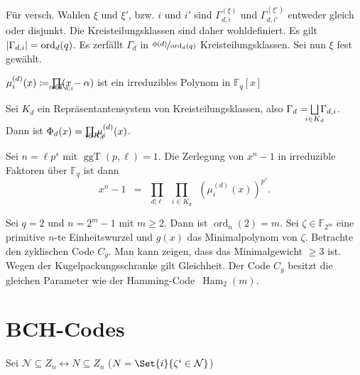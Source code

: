 \documentclass{cheat-sheet}
\newcommand{\F}{\mathbb{F}} %
\newcommand{\divides}{|} %
\DeclareMathOperator{\Ham}{Ham} %
\DeclareMathOperator{\ggT}{ggT} %
\DeclareMathOperator{\ord}{ord} %
\begin{document}
\begin{bem}
  Für versch. Wahlen $\xi$ und $\xi'$, bzw. $i$ und $i'$ sind $\Gamma^{(\xi)}_{d,i}$ und $\Gamma^{(\xi')}_{d,i'}$ entweder gleich oder disjunkt.
  Die Kreisteilungsklassen sind daher wohldefiniert.
  Es gilt $\abs{\Gamma_{d,i}} = \ord_d(q)$.
  Es zerfällt $\Gamma_d$ in $\nicefrac{\phi(d)}{\ord_d(q)}$ Kreisteilungsklassen.
  Sei nun $\xi$ fest gewählt.
\end{bem}

\begin{lem}
  $\mu^{(d)}_i(x) \coloneqq \prod_{\mathclap{\alpha \in \Gamma_{d,i}}} (x - \alpha)$ ist ein irreduzibles Polynom in $\F_q [x]$
\end{lem}

\begin{kor}
  Sei $K_d$ ein Repräsentantensystem von Kreisteilungsklassen, also
  $\Gamma_d = \bigsqcup_{\mathclap{i \in K_d}} \Gamma_{d,i}$.
  Dann ist $\Phi_d(x) = \prod_{\mathclap{i \in K_d}} \mu^{(d)}_i(x)$.
\end{kor}

\begin{fazit}
  Sei $n = \ell p^s$ mit $\ggT(p, \ell) = 1$.
  Die Zerlegung von $x^n - 1$ in irreduzible Faktoren über $\F_q$ ist dann
  \[
    x^n - 1 \enspace = \enspace \prod_{d \divides \ell} \enspace \prod_{i \in K_d} \enspace \left( \mu^{(d)}_i(x) \right)^{p^s}.
  \]
\end{fazit}



\begin{bsp}
  Sei $q = 2$ und $n = 2^m - 1$ mit $m \geq 2$.
  Dann ist $\ord_n(2) = m$.
  Sei $\zeta \in \F_{2^m}$ eine primitive $n$-te Einheitswurzel und $g(x)$ das Minimalpolynom von $\zeta$.
  Betrachte den zyklischen Code $C_g$.
  Man kann zeigen, dass das Minimalgewicht $\geq 3$ ist.
  Wegen der Kugelpackungsschranke gilt Gleichheit.
  Der Code $C_g$ besitzt die gleichen Parameter wie der Hamming-Code~$\Ham_2(m)$.
\end{bsp}


\section{BCH-Codes}


Sei $\mathcal{N} \subseteq Z_n \leftrightarrow N \subseteq Z_n$ ($N = \Set{i}{\zeta^i \in \mathcal{N}}$)
\end{document}
